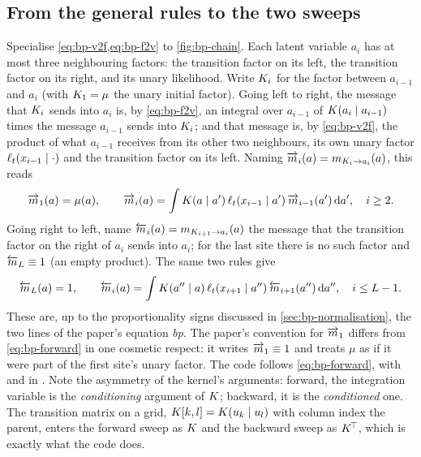 \subsection{From the general rules to the two sweeps}

Specialise \cref{eq:bp-v2f,eq:bp-f2v} to \cref{fig:bp-chain}. Each latent variable $a_i$
has at most three neighbouring factors: the transition factor on its left, the
transition factor on its right, and its unary likelihood. Write $K_{i}$ for the
factor between $a_{i-1}$ and $a_i$ (with $K_1=\mu$ the unary initial factor).
Going left to right, the message that $K_{i}$ sends into $a_i$ is, by
\cref{eq:bp-f2v}, an integral over $a_{i-1}$ of $K(a_i\mid a_{i-1})$ times the
message $a_{i-1}$ sends into $K_i$; and that message is, by \cref{eq:bp-v2f}, the
product of what $a_{i-1}$ receives from its other two neighbours, its own unary factor
$\ell_t(x_{i-1}\mid\cdot)$ and the transition factor on its left. Naming
$\overrightarrow{m}_i(a)=m_{K_i\to a_i}(a)$, this reads
\begin{equation}
  \overrightarrow{m}_1(a)=\mu(a),\qquad
  \overrightarrow{m}_i(a)=\int K(a\mid a')\,\ell_t(x_{i-1}\mid a')\,\overrightarrow{m}_{i-1}(a')\,\mathrm{d} a',\quad i\ge2.
  \label{eq:bp-forward}
\end{equation}
Going right to left, name $\overleftarrow{m}_i(a)=m_{K_{i+1}\to a_i}(a)$ the message that the
transition factor on the right of $a_i$ sends into $a_i$; for the last site there is
no such factor and $\overleftarrow{m}_L\equiv1$ (an empty product). The same two rules give
\begin{equation}
  \overleftarrow{m}_L(a)=1,\qquad
  \overleftarrow{m}_i(a)=\int K(a''\mid a)\,\ell_t(x_{i+1}\mid a'')\,\overleftarrow{m}_{i+1}(a'')\,\mathrm{d} a'',\quad i\le L-1.
  \label{eq:bp-backward}
\end{equation}
These are, up to the proportionality signs discussed in \cref{sec:bp-normalisation},
the two lines of the paper's equation \emph{bp}. The paper's convention for
$\overrightarrow{m}_1$ differs from \cref{eq:bp-forward} in one cosmetic respect: it writes
$\overrightarrow{m}_1\equiv1$ and treats $\mu$ as if it were part of the first site's unary factor.
The code follows \cref{eq:bp-forward}, with  and
 in . Note the asymmetry of the
kernel's arguments: forward, the integration variable is the \emph{conditioning}
argument of $K$; backward, it is the \emph{conditioned} one. The transition
matrix on a grid, $K[k,l]=K(u_{k}\mid u_{l})$ with column index
the parent, enters the forward sweep as $K$ and the backward sweep as
$K^{\!\top}$, which is exactly what the code does.

